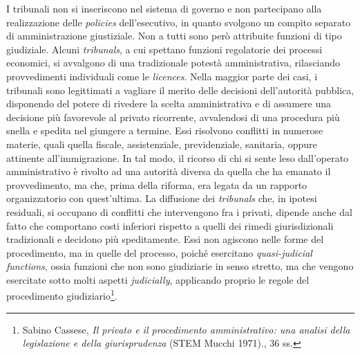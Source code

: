 \documentclass[12pt,it,a4paper,]{report}
\begin{document}
I tribunali non si inseriscono nel sistema di governo e non partecipano
alla realizzazione delle \emph{policies} dell'esecutivo, in quanto
svolgono un compito separato di amministrazione giustiziale. Non a tutti
sono però attribuite funzioni di tipo giudiziale. Alcuni
\emph{tribunals}, a cui spettano funzioni regolatorie dei processi
economici, si avvalgono di una tradizionale potestà amministrativa,
rilasciando provvedimenti individuali come le \emph{licences}. Nella
maggior parte dei casi, i tribunali sono legittimati a vagliare il
merito delle decisioni dell'autorità pubblica, disponendo del potere di
rivedere la scelta amministrativa e di assumere una decisione più
favorevole al privato ricorrente, avvalendosi di una procedura più
snella e spedita nel giungere a termine. Essi risolvono conflitti in
numerose materie, quali quella fiscale, assistenziale, previdenziale,
sanitaria, oppure attinente all'immigrazione. In tal modo, il ricorso di
chi si sente leso dall'operato amministrativo è rivolto ad una autorità
diversa da quella che ha emanato il provvedimento, ma che, prima della
riforma, era legata da un rapporto organizzatorio con quest'ultima. La
diffusione dei \emph{tribunals} che, in ipotesi residuali, si occupano
di conflitti che intervengono fra i privati, dipende anche dal fatto che
comportano costi inferiori rispetto a quelli dei rimedi giurisdizionali
tradizionali e decidono più speditamente. Essi non agiscono nelle forme
del procedimento, ma in quelle del processo, poiché esercitano
\emph{quasi-judicial functions}, ossia funzioni che non sono giudiziarie
in senso stretto, ma che vengono esercitate sotto molti aspetti
\emph{judicially}, applicando proprio le regole del procedimento
giudiziario\footnote{{Sabino Cassese, \emph{Il privato e il procedimento
  amministrativo: una analisi della legislazione e della giurisprudenza}
  (STEM Mucchi 1971).}, 36 ss.}.
\end{document}
